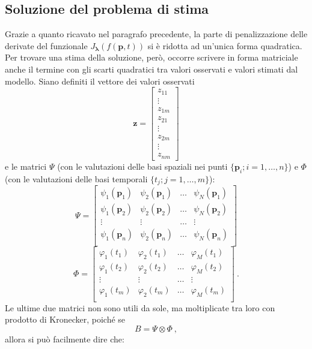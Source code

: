 \documentclass[a4paper,11pt,twoside,openright]{book}							%
\begin{document}
\subsection{Soluzione del problema di stima}
Grazie a quanto ricavato nel paragrafo precedente, la parte di penalizzazione delle derivate del funzionale $J_{\bm \lambda }(f(\bm p,t))$ si è ridotta ad un'unica forma quadratica. Per trovare una stima della soluzione, però, occorre scrivere in forma matriciale anche il termine con gli scarti quadratici tra valori osservati e valori stimati dal modello. Siano definiti il vettore dei valori osservati
\begin{equation}
\bm z =
\begin{bmatrix}
z_{11}  \\
\vdots\\
z_{1m}  \\
z_{21}  \\
\vdots\\
z_{2m}  \\
\vdots\\
z_{nm}
\end{bmatrix}
\end{equation}
e le matrici $\Psi$ (con le valutazioni delle basi spaziali nei punti $\{\bm p_i; i = 1,\ldots,n\}$) e $\Phi$ (con le valutazioni delle basi temporali $\{t_j; j = 1,\ldots,m\}$):
$$
\Psi =
\begin{bmatrix}
\psi_{1}(\bm p_1) & \psi_{2}(\bm p_1) & \hdots & \psi_{N}(\bm p_1)  \\
\psi_{1}(\bm p_2) & \psi_{2}(\bm p_2) & \hdots & \psi_{N}(\bm p_2)  \\
\vdots & \vdots & \hdots & \vdots \\
\psi_{1}(\bm p_n) & \psi_{2}(\bm p_n) & \hdots & \psi_{N}(\bm p_n)  \\
\end{bmatrix}
$$
$$
\Phi = 
\begin{bmatrix}
\varphi_{1}( t_1) & \varphi_{2}( t_1) & \hdots & \varphi_{M}( t_1)  \\
\varphi_{1}( t_2) & \varphi_{2}( t_2) & \hdots & \varphi_{M}( t_2)  \\
\vdots & \vdots & \hdots & \vdots \\
\varphi_{1}( t_m) & \varphi_{2}( t_m) & \hdots & \varphi_{M}( t_m)  \\
\end{bmatrix} \ .
$$
Le ultime due matrici non sono utili da sole, ma moltiplicate tra loro con prodotto di Kronecker, poiché se
$$ B = \Psi \otimes \Phi \ ,$$
allora si può facilmente dire che:
\end{document}
